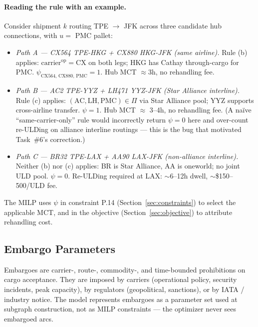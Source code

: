 \documentclass[11pt,a4paper]{article}
\theoremstyle{definition}
\begin{document}
\paragraph{Reading the rule with an example.}
Consider shipment $k$ routing TPE $\to$ JFK across three candidate hub connections, with
$u = $ PMC pallet:
\begin{itemize}[noitemsep]
  \item \emph{Path A --- CX564 TPE-HKG + CX880 HKG-JFK (same airline).} Rule (b) applies:
        $\text{carrier}^{\text{op}} = \text{CX}$ on both legs; HKG has Cathay through-cargo
        for PMC. $\psi_{\text{CX564, CX880, PMC}} = 1$. Hub MCT $\approx 3$h, no rehandling fee.
  \item \emph{Path B --- AC2 TPE-YYZ + LH471 YYZ-JFK (Star Alliance interline).} Rule (c)
        applies: $(\text{AC}, \text{LH}, \text{PMC}) \in \Pi$ via Star Alliance pool;
        YYZ supports cross-airline transfer. $\psi = 1$. Hub MCT $\approx$ 3--4h, no
        rehandling fee. (A naïve ``same-carrier-only'' rule would incorrectly return
        $\psi = 0$ here and over-count re-ULDing on alliance interline routings ---
        this is the bug that motivated Task~\#6's correction.)
  \item \emph{Path C --- BR32 TPE-LAX + AA90 LAX-JFK (non-alliance interline).} Neither
        (b) nor (c) applies: BR is Star Alliance, AA is oneworld; no joint ULD pool.
        $\psi = 0$. Re-ULDing required at LAX: $\sim$6--12h dwell, $\sim$\$150--500/ULD fee.
\end{itemize}

The MILP uses $\psi$ in constraint P.14 (Section~\ref{sec:constraints}) to select the
applicable MCT, and in the objective (Section~\ref{sec:objective}) to attribute
rehandling cost.

\subsection{Embargo Parameters}
\label{sec:embargo}

Embargoes are carrier-, route-, commodity-, and time-bounded prohibitions on cargo
acceptance. They are imposed by carriers (operational policy, security incidents,
peak capacity), by regulators (geopolitical, sanctions), or by IATA / industry
notice. The model represents embargoes as a parameter set used at subgraph
construction, not as MILP constraints — the optimizer never sees embargoed arcs.
\end{document}
